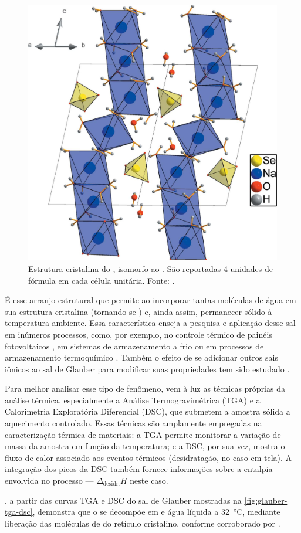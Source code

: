 \begin{figure}
    \centering
    \includegraphics[width=0.4\linewidth]{img/Na2SeO4.10H2O-structure.jpg}
    \caption{Estrutura cristalina do , isomorfo ao . São reportadas 4 unidades de fórmula em cada célula unitária. Fonte: \textcite{Kamburov2014}.}
    \label{fig:glauber-structure}
\end{figure}

É esse arranjo estrutural que permite ao  incorporar tantas moléculas de água em sua estrutura cristalina (tornando-se ) e, ainda assim, permanecer sólido à temperatura ambiente.
Essa característica enseja a pesquisa e aplicação desse sal em inúmeros processos, como, por exemplo, no controle térmico de painéis fotovoltaicos \cite{Gholami2023}, em sistemas de armazenamento a frio \cite{Xu2018} ou em processos de armazenamento termoquímico \cite{Donkers2015}. Também o efeito de se adicionar outros sais iônicos ao sal de Glauber para modificar suas propriedades tem sido estudado \cite{SankarDeepa2022}.

Para melhor analisar esse tipo de fenômeno, vem à luz as técnicas próprias da análise térmica, especialmente a Análise Termogravimétrica (TGA) e a Calorimetria Exploratória Diferencial (DSC), que submetem a amostra sólida a aquecimento controlado. Essas técnicas são amplamente empregadas na caracterização térmica de materiais: a TGA permite monitorar a variação de massa da amostra em função da temperatura; e a DSC, por sua vez, mostra o fluxo de calor associado aos eventos térmicos (desidratação, no caso em tela). A integração dos picos da DSC também fornece informações sobre a entalpia envolvida no processo --- $\Delta_{\text{desidr.}} H$ neste caso. \cite{Gabbott2008}

\textcite{Rens2012}, a partir das curvas TGA e DSC do sal de Glauber mostradas na \autoref{fig:glauber-tga-dsc}, demonstra que o  se decompõe em  e água líquida a \qty{32}{\celsius}, mediante liberação das moléculas de  do retículo cristalino, conforme corroborado por \textcite{Donkers2015}.

